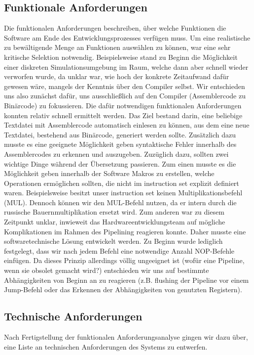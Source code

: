 \documentclass[paper=a4,fontsize=12pt]{scrreprt}
\begin{document}
\subsection{Funktionale Anforderungen}
Die funktionalen Anforderungen beschreiben, über welche Funktionen die Software am Ende des Entwicklungsprozesses verfügen muss. Um eine realistische zu bewältigende Menge an Funktionen auswählen zu können, war eine sehr kritische Selektion notwendig. Beispielsweise stand zu Beginn die Möglichkeit einer diskreten Simulationsumgebung im Raum, welche dann aber schnell wieder verworfen wurde, da unklar war, wie hoch der konkrete Zeitaufwand dafür gewesen wäre, mangels der Kenntnis über den Compiler selbst. Wir entschieden uns also zunächst dafür, uns ausschließlich auf den Compiler (Assemblercode zu Binärcode) zu fokussieren. 
Die dafür notwendigen funktionalen Anforderungen konnten relativ schnell ermittelt werden. Das Ziel bestand darin, eine beliebige Textdatei mit Assemblercode automatisch einlesen zu können, aus dem eine neue Textdatei, bestehend aus Binärcode, generiert werden sollte. Zusätzlich dazu musste es eine geeignete Möglichkeit geben syntaktische Fehler innerhalb des Assemblercodes zu erkennen und auszugeben. Zuzüglich dazu, sollten zwei wichtige Dinge während der Übersetzung passieren. Zum einen musste es die Möglichkeit geben innerhalb der Software Makros zu erstellen, welche Operationen ermöglichen sollten, die nicht im instruction set explizit definiert waren. Beispielsweise besitzt unser instruction set keinen Multiplikationsbefehl (MUL). Dennoch können wir den MUL-Befehl nutzen, da er intern durch die russische Bauernmultiplikation ersetzt wird. Zum anderen war zu diesem Zeitpunkt unklar, inwieweit das Hardwareentwicklungsteam auf mögliche Komplikationen im Rahmen des Pipelining reagieren konnte. Daher musste eine softwaretechnische Lösung entwickelt werden. Zu Beginn wurde lediglich festgelegt, dass wir nach jedem Befehl eine notwendige Anzahl NOP-Befehle einfügen. Da dieses Prinzip allerdings völlig ungeeignet ist (wofür eine Pipeline, wenn sie obsolet gemacht wird?) entschieden wir uns auf bestimmte Abhängigkeiten von Beginn an zu reagieren (z.B. flushing der Pipeline vor einem Jump-Befehl oder das Erkennen der Abhängigkeiten von genutzten Registern). 

\subsection{Technische Anforderungen}
Nach Fertigstellung der funktionalen Anforderungsanalyse gingen wir dazu über, eine Liste an technischen Anforderungen des Systems zu entwerfen. 
\end{document}

